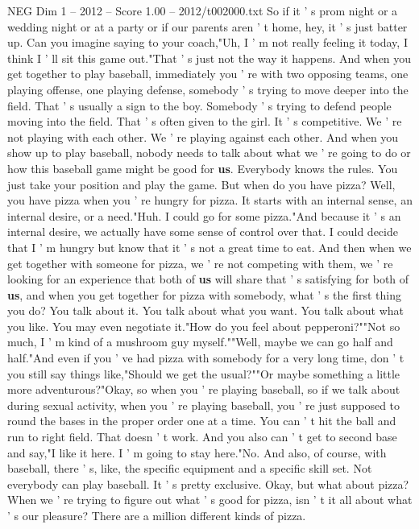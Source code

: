 \begin{textsample}{NEG Dim 1 – 2012 – Score 1.00 – 2012/t002000.txt}
So if it ' s prom night or a wedding night or at a party or if our parents aren ' t home, hey, it ' s just batter up.
Can you imagine saying to your coach,"Uh, I ' m not really feeling it today, I think I ' ll sit this game out."That ' s just not the way it happens.
And when you get together to play baseball, immediately you ' re with two opposing teams, one playing offense, one playing defense, somebody ' s trying to move deeper into the field.
That ' s usually a sign to the boy.
Somebody ' s trying to defend people moving into the field.
That ' s often given to the girl.
It ' s competitive.
We ' re not playing with each other.
We ' re playing against each other.
And when you show up to play baseball, nobody needs to talk about what we ' re going to do or how this baseball game might be good for \textbf{us}.
Everybody knows the rules.
You just take your position and play the game.
But when do you have pizza?
Well, you have pizza when you ' re hungry for pizza.
It starts with an internal sense, an internal desire, or a need."Huh.
I could go for some pizza."And because it ' s an internal desire, we actually have some sense of control over that.
I could decide that I ' m hungry but know that it ' s not a great time to eat.
And then when we get together with someone for pizza, we ' re not competing with them, we ' re looking for an experience that both of \textbf{us} will share that ' s satisfying for both of \textbf{us}, and when you get together for pizza with somebody, what ' s the first thing you do?
You talk about it.
You talk about what you want.
You talk about what you like.
You may even negotiate it."How do you feel about pepperoni?""Not so much, I ' m kind of a mushroom guy myself.""Well, maybe we can go half and half."And even if you ' ve had pizza with somebody for a very long time, don ' t you still say things like,"Should we get the usual?""Or maybe something a little more adventurous?"Okay, so when you ' re playing baseball, so if we talk about during sexual activity, when you ' re playing baseball, you ' re just supposed to round the bases in the proper order one at a time.
You can ' t hit the ball and run to right field.
That doesn ' t work.
And you also can ' t get to second base and say,"I like it here.
I ' m going to stay here."No.
And also, of course, with baseball, there ' s, like, the specific equipment and a specific skill set.
Not everybody can play baseball.
It ' s pretty exclusive.
Okay, but what about pizza?
When we ' re trying to figure out what ' s good for pizza, isn ' t it all about what ' s our pleasure?
There are a million different kinds of pizza.

\end{textsample}

